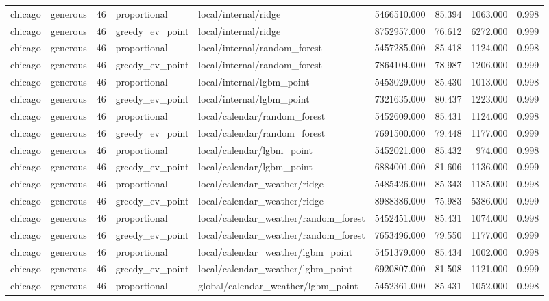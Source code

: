 \begin{tabular}{llrllrrrr}
chicago & generous & 46 & proportional & local/internal/ridge & 5466510.000 & 85.394 & 1063.000 & 0.998 \\
chicago & generous & 46 & greedy\_ev\_point & local/internal/ridge & 8752957.000 & 76.612 & 6272.000 & 0.999 \\
chicago & generous & 46 & proportional & local/internal/random\_forest & 5457285.000 & 85.418 & 1124.000 & 0.998 \\
chicago & generous & 46 & greedy\_ev\_point & local/internal/random\_forest & 7864104.000 & 78.987 & 1206.000 & 0.999 \\
chicago & generous & 46 & proportional & local/internal/lgbm\_point & 5453029.000 & 85.430 & 1013.000 & 0.998 \\
chicago & generous & 46 & greedy\_ev\_point & local/internal/lgbm\_point & 7321635.000 & 80.437 & 1223.000 & 0.999 \\
chicago & generous & 46 & proportional & local/calendar/random\_forest & 5452609.000 & 85.431 & 1124.000 & 0.998 \\
chicago & generous & 46 & greedy\_ev\_point & local/calendar/random\_forest & 7691500.000 & 79.448 & 1177.000 & 0.999 \\
chicago & generous & 46 & proportional & local/calendar/lgbm\_point & 5452021.000 & 85.432 & 974.000 & 0.998 \\
chicago & generous & 46 & greedy\_ev\_point & local/calendar/lgbm\_point & 6884001.000 & 81.606 & 1136.000 & 0.999 \\
chicago & generous & 46 & proportional & local/calendar\_weather/ridge & 5485426.000 & 85.343 & 1185.000 & 0.998 \\
chicago & generous & 46 & greedy\_ev\_point & local/calendar\_weather/ridge & 8988386.000 & 75.983 & 5386.000 & 0.999 \\
chicago & generous & 46 & proportional & local/calendar\_weather/random\_forest & 5452451.000 & 85.431 & 1074.000 & 0.998 \\
chicago & generous & 46 & greedy\_ev\_point & local/calendar\_weather/random\_forest & 7653496.000 & 79.550 & 1177.000 & 0.999 \\
chicago & generous & 46 & proportional & local/calendar\_weather/lgbm\_point & 5451379.000 & 85.434 & 1002.000 & 0.998 \\
chicago & generous & 46 & greedy\_ev\_point & local/calendar\_weather/lgbm\_point & 6920807.000 & 81.508 & 1121.000 & 0.999 \\
chicago & generous & 46 & proportional & global/calendar\_weather/lgbm\_point & 5452361.000 & 85.431 & 1052.000 & 0.998 \\

\end{tabular}
